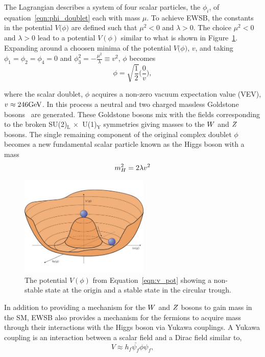 The Lagrangian describes a system of four scalar particles, the $\phi_{i}$,
of equation~\ref{eqn:phi_doublet} each with mass $\mu$. 
To achieve EWSB, the constants in the potential $V\big(\phi\big)$ are defined such that $\mu^{2} < 0$
and $\lambda > 0$. The choice $\mu^{2} < 0$ and $\lambda > 0$ lead to a potential $V\left(\phi\right)$
similar to what is shown in Figure~\ref{fig:higgs_potential}. Expanding around a choosen minima of the potential
$V\big(\phi\big)$, $v$, and taking $\phi_{1} = \phi_{2} = \phi_{4} = 0$ and
$\phi_{3}^{2} = -\frac{\mu^{2}}{\lambda} \equiv v^{2}$, $\phi$ becomes
\begin{equation}
\phi = \sqrt{\frac{1}{2}} \Bigg(\frac{0}{v}\Bigg),
\label{eqn:phi_doublet_exp}
\end{equation}

where the scalar doublet, $\phi$ acquires a non-zero vacuum expectation value (VEV), $v \approx 246\mathrm{GeV}$.
In this process a neutral and two charged massless Goldstone bosons~\cite{PhysRev.127.965} are generated. These Goldstone
bosons mix with the fields corresponding to the broken SU(2)$_{\text{L}} \,\times\,$ U(1)$_{\text{Y}}$
symmetries giving masses to the $W$ and $Z$ bosons. The single remaining component of the
original complex doublet $\phi$ becomes a new fundamental scalar particle 
known as the Higgs boson with a mass
\begin{equation}
m_{H}^{2} = 2\lambda v^2
\end{equation}

\begin{figure}[htbp]
\centering
     \includegraphics[width=0.55\textwidth]{phenomology_of_processes/plots/higgs_potential.pdf}
     \caption{
The potential $V\left(\phi\right)$ from Equation~\ref{eqn:v_pot} showing a non-stable state
at the origin and a stable state in the circular trough.
     }
     \label{fig:higgs_potential}
\end{figure}

In addition to providing a mechanism for the $W$ and $Z$ bosons to gain mass in the SM, EWSB also
provides a mechanism for the fermions to acquire mass through their interactions with the Higgs boson
via Yukawa couplings. A Yukawa coupling is an interaction between a scalar field and a Dirac field
similar to,
\begin{equation}
V \approx h_{f}\bar{\psi_{f}}\phi\psi_{f},
\end{equation}

